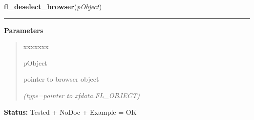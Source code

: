     \label{xformslib:library:fl_deselect_browser}

    \vspace{0.5ex}

\hspace{.8\funcindent}\begin{boxedminipage}{\funcwidth}

    \raggedright \textbf{fl\_deselect\_browser}(\textit{pObject})

    \vspace{-1.5ex}

    \rule{\textwidth}{0.5\fboxrule}
\setlength{\parskip}{2ex}
\setlength{\parskip}{1ex}
      \textbf{Parameters}
      \vspace{-1ex}

      \begin{quote}
        \begin{Ventry}{xxxxxxx}

          \item[pObject]

          pointer to browser object

            {\it (type=pointer to xfdata.FL\_OBJECT)}

        \end{Ventry}

      \end{quote}

\textbf{Status:} Tested + NoDoc + Example = OK



    \end{boxedminipage}

    \label{xformslib:library:fl_isselected_browser_line}

    \vspace{0.5ex}

